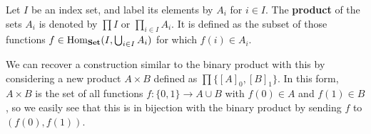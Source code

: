 \begin{definition} \label{set-product}
    Let $I$ be an index set, and label its elements by $A_i$ for $i \in I$. The \textbf{product} of the sets $A_i$ is denoted by $\prod I$ or $\prod_{i \in I} A_i$. It is defined as the subset of those functions $f \in \mathrm{Hom}_{\mathbf{Set}}(I,\bigcup_{i \in I} A_i)$ for which $f(i) \in A_i$. 
    \\
\end{definition}

\begin{remark}
    We can recover a construction similar to the binary product with this by considering a new product $A \times B$ defined as $\prod \{ [A]_0, [B]_1 \}$. In this form, $A \times B$ is the set of all functions $f : \{0,1\} \to A \cup B$ with $f(0) \in A$ and $f(1) \in B$, so we easily see that this is in bijection with the binary product by sending $f$ to $(f(0), f(1))$. 
\end{remark}